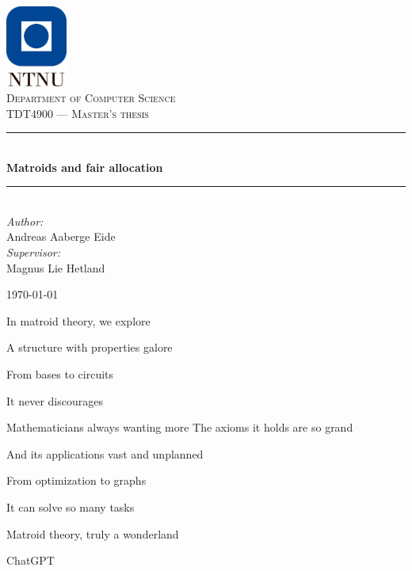 \documentclass[b5paper]{report}
\begin{document}
\newcommand{\mono}[1]{$\texttt{#1}$}

\begin{titlepage}
  \newcommand{\HRule}{\rule{\linewidth}{0.5mm}}

  \vbox{ }
  \vbox{ }
  \begin{center}
    \includegraphics[width=0.15\textwidth]{ntnu.png}\\[1cm]
    \textsc{\Large Department of Computer Science}\\[1.5cm]
    \textsc{\large TDT4900 --- Master's thesis}\\[0.5cm]
    \vbox{ }

    \HRule \\[0.4cm]
    { \huge \bfseries Matroids and fair allocation}\\[0.4cm]
    \HRule \\[1.5cm]

    \large
    \emph{Author:}\\
    Andreas Aaberge Eide\\[0.5cm]
    \emph{Supervisor:}\\
    Magnus Lie Hetland
    \vfill

    {\large \today\par}
  \end{center}
\end{titlepage}


\epigraph{In matroid theory, we explore

A structure with properties galore

From bases to circuits

It never discourages

Mathematicians always wanting more
\newline
\newline
The axioms it holds are so grand

And its applications vast and unplanned

From optimization to graphs

It can solve so many tasks

Matroid theory, truly a wonderland}{ChatGPT}
\end{document}
